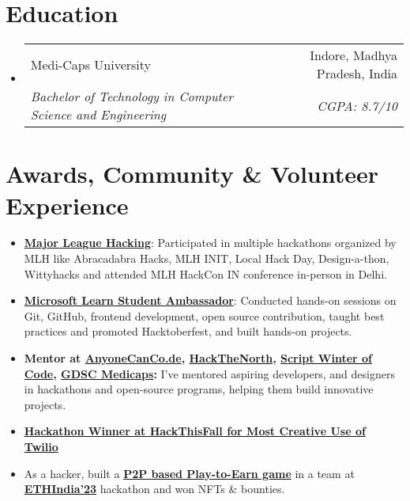 \documentclass[letterpaper,11pt]{article}
\makeatletter
\newcommand{\resumeItem}[1]{
    \item\small{
      {#1 \vspace{-2pt}}
    }
  }
\newcommand{\resumeSubheading}[4]{
    \item
      \begin{tabular*}{0.97\textwidth}[t]{l@{\extracolsep{\fill}}r}
        {#1} & #2 \\
        \textit{\small#3} & \textit{\small #4} \\
      \end{tabular*}\vspace{-5pt}
  }
\newcommand{\resumeSubHeadingListStart}{\begin{itemize}[leftmargin=0.15in, label={}]}
\newcommand{\resumeSubHeadingListEnd}{\end{itemize}}
\newcommand{\resumeItemListStart}{\begin{itemize}}
\newcommand{\resumeItemListEnd}{\end{itemize}}
\makeatother
\begin{document}
\section{Education}
\resumeSubHeadingListStart
\resumeSubheading
{Medi-Caps University}{Indore, Madhya Pradesh, India}
{Bachelor of Technology in Computer Science and Engineering}{CGPA: 8.7/10}
\resumeSubHeadingListEnd



\section{Awards, Community \& Volunteer Experience}
 \begin{itemize}[leftmargin=0.15in, label={}]
    \small{\item{
        \resumeItemListStart
                \resumeItem{\textbf{\href{https://mlh.io}{Major League Hacking}}{: Participated in multiple hackathons organized by MLH like Abracadabra Hacks, MLH INIT, Local Hack Day, Design-a-thon, Wittyhacks and attended MLH HackCon IN conference in-person in Delhi.}} \vspace{3pt}
                \resumeItem{\textbf{\href{https://studentambassadors.microsoft.com/}{Microsoft Learn Student Ambassador}}{: Conducted hands-on sessions on Git, GitHub, frontend development, open source contribution, taught best practices and promoted Hacktoberfest, and built hands-on projects.}} \vspace{3pt}
                \resumeItem{\textbf{Mentor at {\href{https://hackacode.anyonecanco.de}{AnyoneCanCo.de}}, {\href{https://hackthenorth.com}{HackTheNorth}}, {\href{https://swoc.scriptindia.org}{Script Winter of Code}}, {\href{https://gdsc.community.dev/medi-caps-university-indore}{GDSC Medicaps}}:}
 {I've mentored aspiring developers, and designers in hackathons and open-source programs, helping them build innovative projects.}} \vspace{3pt}
                \resumeItem{\textbf{\href{https://devpost.com/software/budgetstay}{Hackathon Winner at HackThisFall for Most Creative Use of Twilio}}} \vspace{3pt}
                \resumeItem{{As a hacker, built a {\textbf{\href{https://devfolio.co/projects/mystic-899b}{{P2P based Play-to-Earn game}}}} in a team at {\textbf{\href{https://ethindia.co/}{{ETHIndia'23}}}} hackathon and won NFTs \& bounties. }} \vspace{3pt} 
      \resumeItemListEnd
    }}
 \end{itemize}
\end{document}
